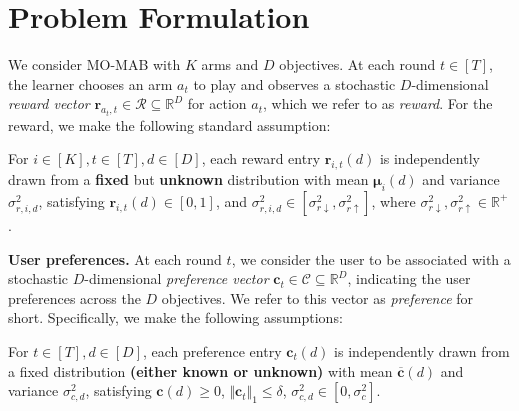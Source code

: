 \section{Problem Formulation}


We consider MO-MAB with $K$ arms and $D$ objectives.
At each round $t \in [T]$, the learner chooses an arm $a_t$ to play and observes a stochastic $D$-dimensional \emph{reward vector} $\boldsymbol{r}_{a_t,t} \in \mathcal{R} \subseteq \mathbb{R}^D$ for action $a_t$, which we refer to as \emph{reward}.
For the reward, we make the following standard assumption:

\begin{assumption}
\label{assmp: all_1}
For $i \in [K], t \in [T], d \in [D]$, each reward entry $\boldsymbol{r}_{i,t}(d)$ is independently drawn from a \textbf{fixed} but \textbf{unknown} distribution with mean $\boldsymbol{\mu}_{i}(d)$ and variance $\sigma_{r,i,d}^2$, satisfying
$\boldsymbol{r}_{i,t} (d) \in [0,1]$, and $\sigma_{r,i,d}^2 \in [\sigma^2_{r \downarrow}, \sigma^2_{r \uparrow}] $, where $\sigma^2_{r \downarrow}, \sigma^2_{r \uparrow} \in \mathbb{R}^{+}$.
\end{assumption}

\textbf{User preferences.}
At each round $t$, we consider the user to be associated with a stochastic $D$-dimensional \emph{preference vector} $\boldsymbol{c}_t \in \mathcal{C} \subseteq \mathbb{R}^D$, indicating the user preferences across the $D$ objectives. 
We refer to this vector as \emph{preference} for short. Specifically, we make the following assumptions:

\begin{assumption}
\label{assmp: all_2}
For $t \in [T], d \in [D]$, each preference entry $\boldsymbol{c}_t(d)$ is independently drawn from a fixed distribution \textbf{(either known or unknown)} with mean $\boldsymbol{\overline{c}}(d)$ and variance $\sigma_{c,d}^2$, satisfying
$\boldsymbol{c}(d) \geq 0$, $\Vert \boldsymbol{c}_t \Vert_1 \leq \delta$, $\sigma_{c,d}^2 \in [0, \sigma^2_{c}]$.
\end{assumption}

